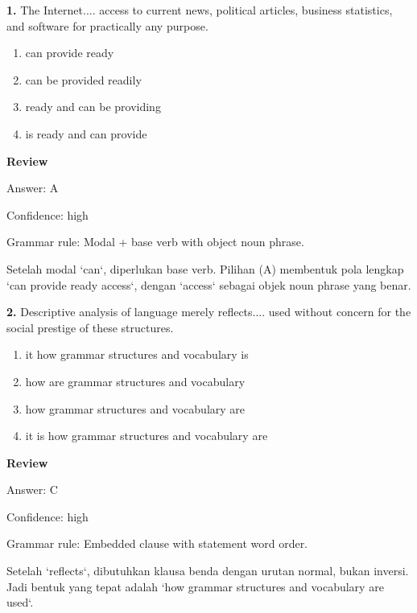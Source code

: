 \documentclass[12pt]{article}
\begin{document}
\noindent\textbf{1.} The Internet.... access to current news, political articles, business statistics, and software for practically any purpose.
\begin{enumerate}[label=(\Alph*),leftmargin=*,itemsep=0.2em]
\item can provide ready
\item can be provided readily
\item ready and can be providing
\item is ready and can provide
\end{enumerate}
\par
\begingroup
\setlength{\parskip}{0pt}
\setlength{\parindent}{0pt}
\textbf{Review}\par
Answer: A\par
Confidence: high\par
Grammar rule: Modal + base verb with object noun phrase.\par
Setelah modal `can`, diperlukan base verb. Pilihan (A) membentuk pola lengkap `can provide ready access`, dengan `access` sebagai objek noun phrase yang benar.\par
\endgroup
\par
\vspace{0.25\baselineskip}
\noindent\textbf{2.} Descriptive analysis of language merely reflects.... used without concern for the social prestige of these structures.
\begin{enumerate}[label=(\Alph*),leftmargin=*,itemsep=0.2em]
\item it how grammar structures and vocabulary is
\item how are grammar structures and vocabulary
\item how grammar structures and vocabulary are
\item it is how grammar structures and vocabulary are
\end{enumerate}
\par
\begingroup
\setlength{\parskip}{0pt}
\setlength{\parindent}{0pt}
\textbf{Review}\par
Answer: C\par
Confidence: high\par
Grammar rule: Embedded clause with statement word order.\par
Setelah `reflects`, dibutuhkan klausa benda dengan urutan normal, bukan inversi. Jadi bentuk yang tepat adalah `how grammar structures and vocabulary are used`.\par
\endgroup
\par
\vspace{0.25\baselineskip}
\end{document}
